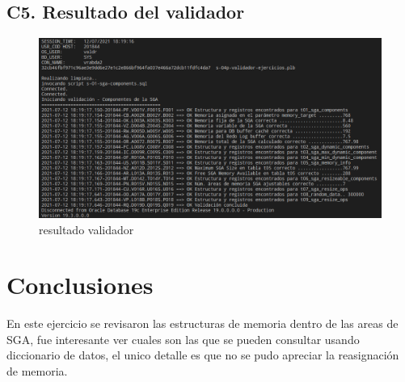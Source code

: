 \documentclass[journal]{IEEEtran}
\begin{document}
\subsection{C5. Resultado del validador}
\begin{figure}[H]
  \centering
  \includegraphics[scale=.20]{captura_2.png}
   \caption{resultado validador}
   \label{fig:validador_val}
\end{figure}
\section{Conclusiones}
En este ejercicio se revisaron las estructuras de memoria dentro de las areas de SGA,
fue interesante ver cuales son las que se pueden consultar usando diccionario de datos,
el unico detalle es que no se pudo apreciar la reasignación de memoria.
\ifCLASSOPTIONcaptionsoff
  \newpage

\fi
\end{document}
